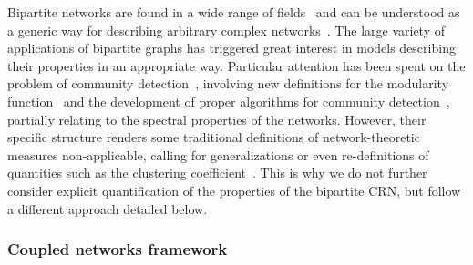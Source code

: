 Bipartite networks are found in a wide range of fields~\cite{Guimera2007,Kitsak2011} and can be understood as a generic way for describing arbitrary complex networks~\cite{Guillaume2004,Guillaume2006}. The large variety of applications of bipartite graphs has triggered great interest in models describing their properties in an appropriate way. Particular attention has been spent on the problem of community detection~\cite{Fortunato2010}, involving new definitions for the modularity function~\cite{Barber2007,Guimera2007,Murata2009,Suzuki2009} and the development of proper algorithms for community detection~\cite{Barber2007,Du2008,Lehmann2008,Sawardecker2009}, partially relating to the spectral properties of the networks. However, their specific structure renders some traditional definitions of network-theoretic measures non-applicable, calling for generalizations or even re-definitions of quantities such as the clustering coefficient~\cite{Lind2005,Zhang2008PhysA}. This is why we do not further consider explicit quantification of the properties of the bipartite CRN, but follow a different approach detailed below.

		\subsubsection{Coupled networks framework}
        

